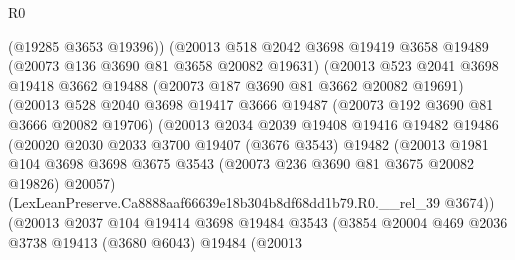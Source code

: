 \begin{lexlean}{R0}
\begin{coremodule}
                        (@19285 @3653 @19396))
                      (@20013
                        @518
                        @2042
                        @3698
                        @19419
                        @3658
                        @19489
                        (@20073 @136 @3690 @81 @3658 @20082 @19631)
                        (@20013
                          @523
                          @2041
                          @3698
                          @19418
                          @3662
                          @19488
                          (@20073 @187 @3690 @81 @3662 @20082 @19691)
                          (@20013
                            @528
                            @2040
                            @3698
                            @19417
                            @3666
                            @19487
                            (@20073 @192 @3690 @81 @3666 @20082 @19706)
                            (@20013
                              @2034
                              @2039
                              @19408
                              @19416
                              @19482
                              @19486
                              (@20020
                                @2030
                                @2033
                                @3700
                                @19407
                                (@3676 @3543)
                                @19482
                                (@20013
                                  @1981
                                  @104
                                  @3698
                                  @3698
                                  @3675
                                  @3543
                                  (@20073 @236 @3690 @81 @3675 @20082 @19826)
                                  @20057)
                                (LexLeanPreserve.Ca8888aaf66639e18b304b8df68dd1b79.R0.__rel_39
                                  @3674))
                              (@20013
                                @2037
                                @104
                                @19414
                                @3698
                                @19484
                                @3543
                                (@3854
                                  @20004
                                  @469
                                  @2036
                                  @3738
                                  @19413
                                  (@3680 @6043)
                                  @19484
                                  (@20013

\end{coremodule}
\end{lexlean}
